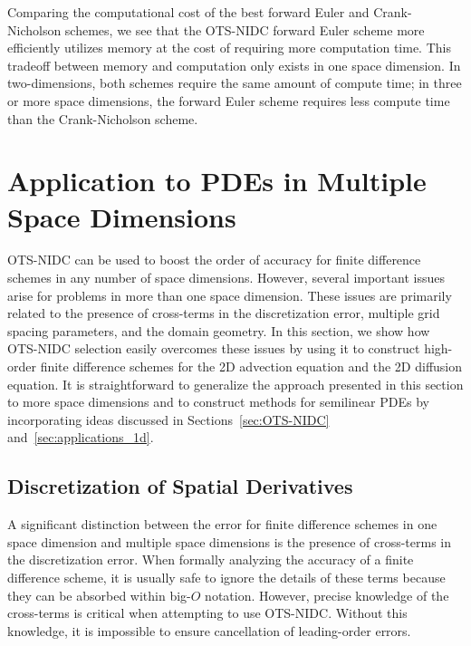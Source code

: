 \documentclass[fleqn,12pt,twoside]{article}
\begin{document}
Comparing the computational cost of the best forward Euler and Crank-Nicholson 
schemes, we see that the OTS-NIDC forward Euler scheme more efficiently 
utilizes memory at the cost of requiring more computation time.  This tradeoff 
between memory and computation only exists in one space dimension.  In 
two-dimensions, both schemes require the same amount of compute time; in three 
or more space dimensions, the forward Euler scheme requires less compute time 
than the Crank-Nicholson scheme.  


\section{\label{sec:applications_multidim}
         Application to PDEs in Multiple Space Dimensions}
OTS-NIDC can be used to boost the order of accuracy for finite difference 
schemes in any number of space dimensions.  However, several important issues 
arise for problems in more than one space dimension.  These issues are 
primarily related to the presence of cross-terms in the discretization error, 
multiple grid spacing parameters,  and the domain geometry.  In this section, 
we show how OTS-NIDC selection easily overcomes these issues by using it to 
construct high-order finite difference schemes for the 2D advection equation 
and the 2D diffusion equation.  
It is straightforward to generalize the approach presented in this section to 
more space dimensions and to construct methods for semilinear PDEs by 
incorporating ideas discussed in 
Sections~\ref{sec:OTS-NIDC} and~\ref{sec:applications_1d}.  


\subsection{\label{sec:ots_multidim_crossterms}
            Discretization of Spatial Derivatives}
A significant distinction between the error for finite difference schemes in 
one space dimension and multiple space dimensions is the presence of 
cross-terms in the discretization error.  When formally analyzing the accuracy
of a finite difference scheme, it is usually safe to ignore the details of 
these terms because they can be absorbed within big-$O$ notation.
However, precise knowledge of the cross-terms is critical when attempting to 
use OTS-NIDC.  Without this knowledge, it is impossible to 
ensure cancellation of leading-order errors.  
\end{document}
